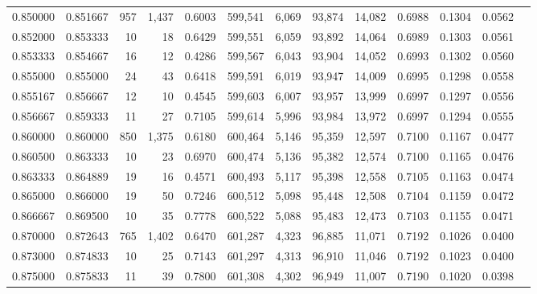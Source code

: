 \begin{tabular}{rrrrrrrrrrrrr}
0.850000 & 0.851667 &    957 & 1,437 &                                     0.6003 & 599,541 &   6,069 &  93,874 &  14,082 & 0.6988 & 0.1304 & 0.0562 \\
0.852000 & 0.853333 &     10 &    18 &                                     0.6429 & 599,551 &   6,059 &  93,892 &  14,064 & 0.6989 & 0.1303 & 0.0561 \\
0.853333 & 0.854667 &     16 &    12 &                                     0.4286 & 599,567 &   6,043 &  93,904 &  14,052 & 0.6993 & 0.1302 & 0.0560 \\
0.855000 & 0.855000 &     24 &    43 &                                     0.6418 & 599,591 &   6,019 &  93,947 &  14,009 & 0.6995 & 0.1298 & 0.0558 \\
0.855167 & 0.856667 &     12 &    10 &                                     0.4545 & 599,603 &   6,007 &  93,957 &  13,999 & 0.6997 & 0.1297 & 0.0556 \\
0.856667 & 0.859333 &     11 &    27 &                                     0.7105 & 599,614 &   5,996 &  93,984 &  13,972 & 0.6997 & 0.1294 & 0.0555 \\
0.860000 & 0.860000 &    850 & 1,375 &                                     0.6180 & 600,464 &   5,146 &  95,359 &  12,597 & 0.7100 & 0.1167 & 0.0477 \\
0.860500 & 0.863333 &     10 &    23 &                                     0.6970 & 600,474 &   5,136 &  95,382 &  12,574 & 0.7100 & 0.1165 & 0.0476 \\
0.863333 & 0.864889 &     19 &    16 &                                     0.4571 & 600,493 &   5,117 &  95,398 &  12,558 & 0.7105 & 0.1163 & 0.0474 \\
0.865000 & 0.866000 &     19 &    50 &                                     0.7246 & 600,512 &   5,098 &  95,448 &  12,508 & 0.7104 & 0.1159 & 0.0472 \\
0.866667 & 0.869500 &     10 &    35 &                                     0.7778 & 600,522 &   5,088 &  95,483 &  12,473 & 0.7103 & 0.1155 & 0.0471 \\
0.870000 & 0.872643 &    765 & 1,402 &                                     0.6470 & 601,287 &   4,323 &  96,885 &  11,071 & 0.7192 & 0.1026 & 0.0400 \\
0.873000 & 0.874833 &     10 &    25 &                                     0.7143 & 601,297 &   4,313 &  96,910 &  11,046 & 0.7192 & 0.1023 & 0.0400 \\
0.875000 & 0.875833 &     11 &    39 &                                     0.7800 & 601,308 &   4,302 &  96,949 &  11,007 & 0.7190 & 0.1020 & 0.0398 \\

\end{tabular}
